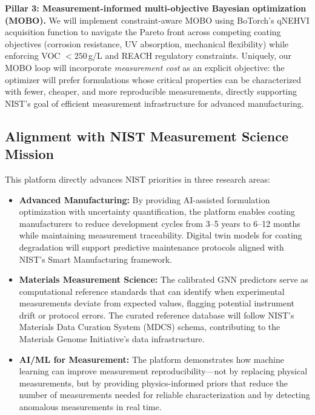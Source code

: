 \documentclass[11pt,letterpaper]{article}
\begin{document}
\textbf{Pillar 3: Measurement-informed multi-objective Bayesian optimization (MOBO).}
We will implement constraint-aware MOBO using BoTorch's qNEHVI acquisition function to navigate the Pareto front across competing coating objectives (corrosion resistance, UV absorption, mechanical flexibility) while enforcing VOC $< 250$\,g/L and REACH regulatory constraints. Uniquely, our MOBO loop will incorporate \textit{measurement cost} as an explicit objective: the optimizer will prefer formulations whose critical properties can be characterized with fewer, cheaper, and more reproducible measurements, directly supporting NIST's goal of efficient measurement infrastructure for advanced manufacturing.

\subsection{Alignment with NIST Measurement Science Mission}

This platform directly advances NIST priorities in three research areas:

\begin{itemize}[leftmargin=*]
  \item \textbf{Advanced Manufacturing:} By providing AI-assisted formulation optimization with uncertainty quantification, the platform enables coating manufacturers to reduce development cycles from 3--5 years to 6--12 months while maintaining measurement traceability. Digital twin models for coating degradation will support predictive maintenance protocols aligned with NIST's Smart Manufacturing framework.

  \item \textbf{Materials Measurement Science:} The calibrated GNN predictors serve as computational reference standards that can identify when experimental measurements deviate from expected values, flagging potential instrument drift or protocol errors. The curated reference database will follow NIST's Materials Data Curation System (MDCS) schema, contributing to the Materials Genome Initiative's data infrastructure.

  \item \textbf{AI/ML for Measurement:} The platform demonstrates how machine learning can improve measurement reproducibility---not by replacing physical measurements, but by providing physics-informed priors that reduce the number of measurements needed for reliable characterization and by detecting anomalous measurements in real time.
\end{itemize}
\end{document}
